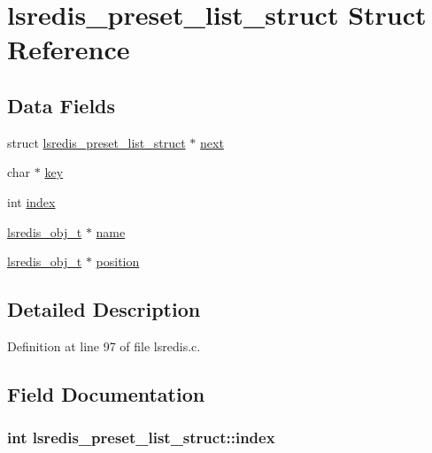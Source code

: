 \hypertarget{structlsredis__preset__list__struct}{\section{lsredis\-\_\-preset\-\_\-list\-\_\-struct Struct Reference}
\label{structlsredis__preset__list__struct}
}
\subsection*{Data Fields}
\begin{DoxyCompactItemize}
\item 
struct \hyperlink{structlsredis__preset__list__struct}{lsredis\-\_\-preset\-\_\-list\-\_\-struct} $\ast$ \hyperlink{structlsredis__preset__list__struct_a14422c8bfa270e5620c66be871091f67}{next}
\item 
char $\ast$ \hyperlink{structlsredis__preset__list__struct_ab3a50b52cf845fa70667d8be9ea7d73b}{key}
\item 
int \hyperlink{structlsredis__preset__list__struct_abadcee1d288db4b988946f62bb28d5df}{index}
\item 
\hyperlink{pgpmac_8h_ad449de06d02791adf2498d2a1e1f909c}{lsredis\-\_\-obj\-\_\-t} $\ast$ \hyperlink{structlsredis__preset__list__struct_a285a79dd419ae70c5b75ef57914d3331}{name}
\item 
\hyperlink{pgpmac_8h_ad449de06d02791adf2498d2a1e1f909c}{lsredis\-\_\-obj\-\_\-t} $\ast$ \hyperlink{structlsredis__preset__list__struct_ae365a576448adeccb66fbb85cfcf4b23}{position}
\end{DoxyCompactItemize}


\subsection{Detailed Description}


Definition at line 97 of file lsredis.\-c.



\subsection{Field Documentation}
\hypertarget{structlsredis__preset__list__struct_abadcee1d288db4b988946f62bb28d5df}{
\subsubsection[{index}]{\setlength{\rightskip}{0pt plus 5cm}int lsredis\-\_\-preset\-\_\-list\-\_\-struct\-::index}}\label{structlsredis__preset__list__struct_abadcee1d288db4b988946f62bb28d5df}


